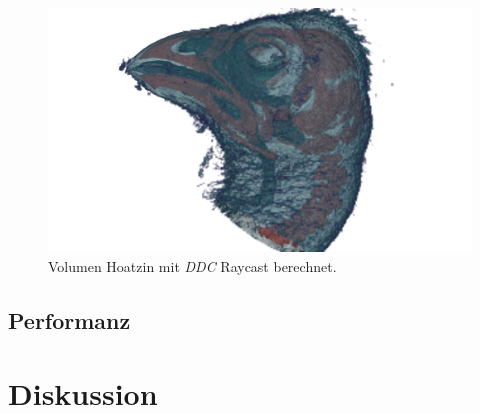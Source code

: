 \begin{landscape}
	\begin{figure}
		\centering
		\includegraphics[width=1\textheight]{../../Grafiken/results/picture_quality/hoatzin/DDC_img-1_ray-1-5.png}
		\caption{Volumen Hoatzin mit \emph{DDC} Raycast berechnet.}
		\label{fig::res::hoa_ddc}
	\end{figure}
\end{landscape}


\subsection{Performanz}






\section*{Diskussion}\label{sec::disc}
